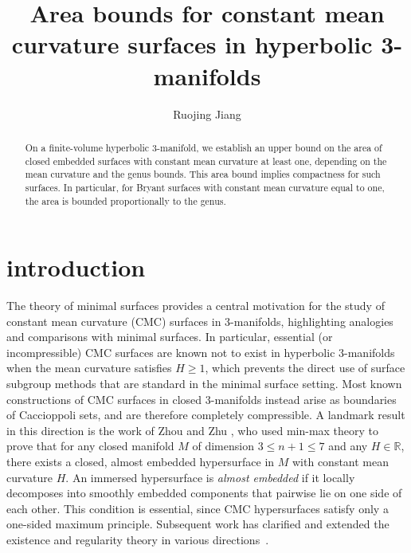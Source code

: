 \documentclass[12pt,a4paper]{amsart}
\numberwithin{equation}{section}
\theoremstyle{plain}
\theoremstyle{named}
\theoremstyle{definition}
\begin{document}
\title[Area bounds for CMC surfaces in hyperbolic 3-manifolds]{Area bounds for constant mean curvature surfaces in hyperbolic 3-manifolds}



\author{Ruojing Jiang}

\address{Massachusetts Institute of Technology, Department of Mathematics, Cambridge, MA 02139} 

 \subjclass[2020]{} 
 \date{}



\begin{abstract}  
On a finite-volume hyperbolic $3$-manifold, we establish an upper bound on the area of closed embedded surfaces with constant mean curvature at least one, depending on the mean curvature and the genus bounds. This area bound implies compactness for such surfaces. In particular, for Bryant surfaces with constant mean curvature equal to one, the area is bounded proportionally to the genus.
\end{abstract}

\maketitle



\section{introduction}
The theory of minimal surfaces provides a central motivation for the study of constant mean curvature (CMC) surfaces in $3$-manifolds, highlighting analogies and comparisons with minimal surfaces. In particular, essential (or incompressible) CMC surfaces are known not to exist in hyperbolic $3$-manifolds when the mean curvature satisfies $H\geq 1$, which prevents the direct use of surface subgroup methods that are standard in the minimal surface setting. Most known constructions of CMC surfaces in closed $3$-manifolds instead arise as boundaries of Caccioppoli sets, and are therefore completely compressible. A landmark result in this direction is the work of Zhou and Zhu \cite{Zhou-Zhu}, who used min-max theory to prove that for any closed manifold $M$ of dimension $3\leq n+1\leq 7$ and any $H\in\mathbb{R}$, there exists a closed, almost embedded hypersurface in $M$ with constant mean curvature $H$. An immersed hypersurface is \emph{almost embedded} if it locally decomposes into smoothly embedded components that pairwise lie on one side of each other. This condition is essential, since CMC hypersurfaces satisfy only a one-sided maximum principle. Subsequent work has clarified and extended the existence and regularity theory in various directions~\cite{ZhouZhuzPMC,Bellettini-Wickramasekera,Sarnataro-Stryker}.
\end{document}
